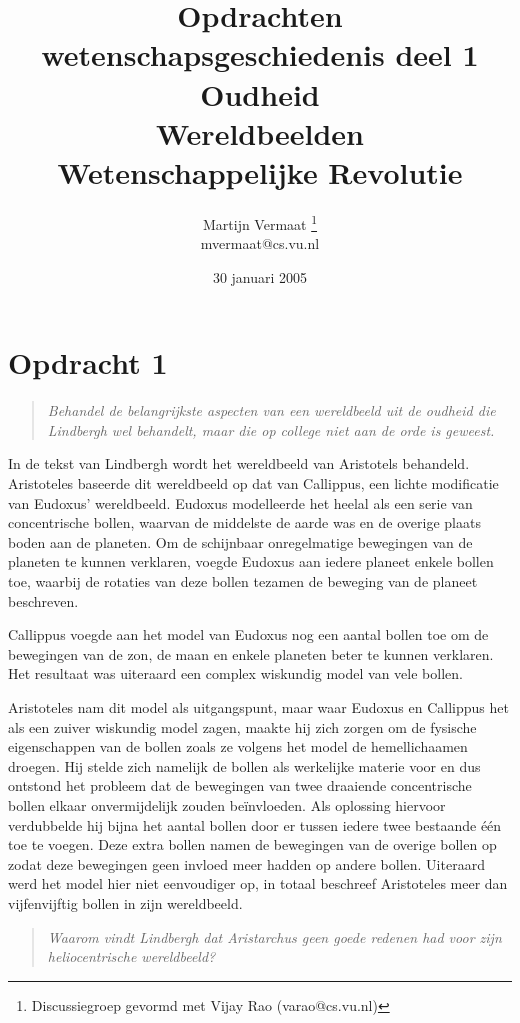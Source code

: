 \documentclass[a4paper,11pt]{article}
\title{Opdrachten wetenschapsgeschiedenis deel 1\\[0.6em]
\normalsize{Oudheid\\
Wereldbeelden\\
Wetenschappelijke Revolutie}}
\author{
    Martijn Vermaat
    \footnote{Discussiegroep gevormd met Vijay Rao (varao@cs.vu.nl)}\\
    mvermaat@cs.vu.nl
}
\date{30 januari 2005}
\begin{document}
\maketitle


\section*{Opdracht 1}


\begin{quote}
\emph{Behandel de belangrijkste aspecten van een wereldbeeld uit de oudheid
  die Lindbergh wel behandelt, maar die op college niet aan de orde is
  geweest.}
\end{quote}


In de tekst van Lindbergh wordt het wereldbeeld van Aristotels
behandeld. Aristoteles baseerde dit wereldbeeld op dat van Callippus, een
lichte modificatie van Eudoxus' wereldbeeld. Eudoxus modelleerde het heelal
als een serie van concentrische bollen, waarvan de middelste de aarde was en
de overige plaats boden aan de planeten. Om de schijnbaar onregelmatige
bewegingen van de planeten te kunnen verklaren, voegde Eudoxus aan iedere
planeet enkele bollen toe, waarbij de rotaties van deze bollen tezamen de
beweging van de planeet beschreven.

Callippus voegde aan het model van Eudoxus nog een aantal bollen toe om de
bewegingen van de zon, de maan en enkele planeten beter te kunnen
verklaren. Het resultaat was uiteraard een complex wiskundig model van vele
bollen.

Aristoteles nam dit model als uitgangspunt, maar waar Eudoxus en Callippus
het als een zuiver wiskundig model zagen, maakte hij zich zorgen om de
fysische eigenschappen van de bollen zoals ze volgens het model de
hemellichaamen droegen. Hij stelde zich namelijk de bollen als werkelijke
materie voor en dus ontstond het probleem dat de bewegingen van twee draaiende
concentrische bollen elkaar onvermijdelijk zouden be\"invloeden. Als oplossing
hiervoor verdubbelde hij bijna het aantal bollen door er tussen iedere twee
bestaande \'e\'en toe te voegen. Deze extra bollen namen de bewegingen van de
overige bollen op zodat deze bewegingen geen invloed meer hadden op andere
bollen. Uiteraard werd het model hier niet eenvoudiger op, in totaal beschreef
Aristoteles meer dan vijfenvijftig bollen in zijn wereldbeeld.


\begin{quote}
\emph{Waarom vindt Lindbergh dat Aristarchus geen goede redenen had voor zijn
  heliocentrische wereldbeeld?}
\end{quote}
\end{document}
